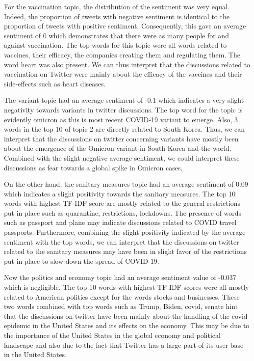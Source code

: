 \documentclass[letterpaper]{article} %
\begin{document}
For the vaccination topic, the distribution of the sentiment was very equal. Indeed, the proportion of tweets with negative sentiment is identical to the proportion of tweets with positive sentiment. Consequently, this gave an average sentiment of 0 which demonstrates that there were as many people for and against vaccination. The top words for this topic were all words related to vaccines, their efficacy, the companies creating them and regulating them. The word heart was also present. We can thus interpret that the discussions related to vaccination on Twitter were mainly about the efficacy of the vaccines and their side-effects such as heart diseases. 

The variant topic had an average sentiment of -0.1 which indicates a very slight negativity towards variants in twitter discussions. The top word for the topic is evidently omicron as this is most recent COVID-19 variant to emerge. Also, 3 words in the top 10 of topic 2 are directly related to South Korea. Thus, we can interpret that the discussions on twitter concerning variants have mostly been about the emergence of the Omicron variant in South Korea and the world. Combined with the slight negative average sentiment, we could interpret these discussions as fear towards a global spike in Omicron cases. 

On the other hand, the sanitary measures topic had an average sentiment of 0.09 which indicates a slight positivity towards the sanitary measures. The top 10 words with highest TF-IDF score are mostly related to the general restrictions put in place such as quarantine, restrictions, lockdowns. The presence of words such as passport and plane may indicate discussions related to COVID travel passports. Furthermore, combining the slight positivity indicated by the average sentiment with the top words, we can interpret that the discussions on twitter related to the sanitary measures may have been in slight favor of the restrictions put in place to slow down the spread of COVID-19.

Now the politics and economy topic had an average sentiment value of -0.037 which is negligible. The top 10 words with highest TF-IDF scores were all mostly related to American politics except for the words stocks and businesses. These two words combined with top words such as Trump, Biden, covid, senate hint that the discussions on twitter have been mainly about the handling of the covid epidemic in the United States and its effects on the economy. This may be due to the importance of the United States in the global economy and political landscape and also due to the fact that Twitter has a large part of its user base in the United States. 
\end{document}
